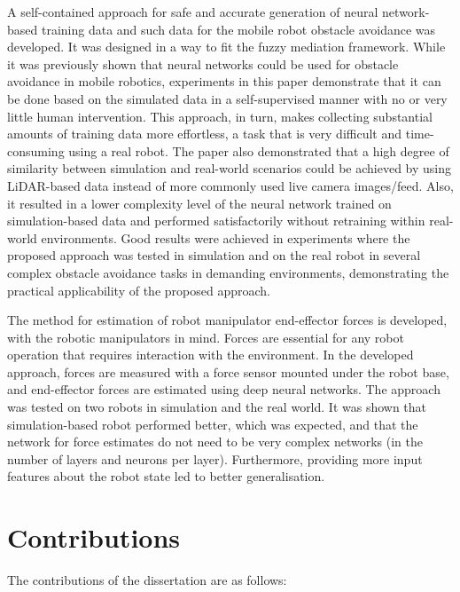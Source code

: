 A self-contained approach for safe and accurate generation of neural network-based training data and such data for the mobile robot obstacle avoidance was developed. It was designed in a way to fit the fuzzy mediation framework. While it was previously shown that neural networks could be used for obstacle avoidance in mobile robotics, experiments in this paper demonstrate that it can be done based on the simulated data in a self-supervised manner with no or very little human intervention. This approach, in turn, makes collecting substantial amounts of training data more effortless, a task that is very difficult and time-consuming using a real robot. The paper also demonstrated that a high degree of similarity between simulation and real-world scenarios could be achieved by using LiDAR-based data instead of more commonly used live camera images/feed. Also, it resulted in a lower complexity level of the neural network trained on simulation-based data and performed satisfactorily without retraining within real-world environments. Good results were achieved in experiments where the proposed approach was tested in simulation and on the real robot in several complex obstacle avoidance tasks in demanding environments, demonstrating the practical applicability of the proposed approach.

The method for estimation of robot manipulator end-effector forces is developed, with the robotic manipulators in mind. Forces are essential for any robot operation that requires interaction with the environment. In the developed approach, forces are measured with a force sensor mounted under the robot base, and end-effector forces are estimated using deep neural networks. The approach was tested on two robots in simulation and the real world. It was shown that simulation-based robot performed better, which was expected, and that the network for force estimates do not need to be very complex networks (in the number of layers and neurons per layer). Furthermore, providing more input features about the robot state led to better generalisation.

\section{Contributions}

The contributions of the dissertation are as follows:

